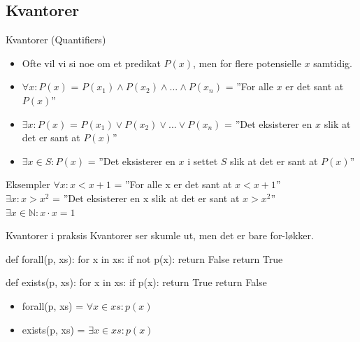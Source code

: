 \subsection{Kvantorer}
\begin{frame}{Kvantorer (Quantifiers)}
    \begin{itemize}
        \item Ofte vil vi si noe om et predikat $P(x)$, men for flere potensielle $x$ samtidig.
        \pause
        \item $\forall x : P(x)$ = $P(x_1) \land P(x_2) \land ... \land P(x_n)$ = ''For alle $x$ er det sant at $P(x)$''
        \pause
        \item $\exists x : P(x)$ = $P(x_1) \lor P(x_2) \lor ... \lor P(x_n)$ = ''Det eksisterer en $x$ slik at det er sant at $P(x)$''
        \pause
        \item $\exists x \in S : P(x)$ = ''Det eksisterer en $x$ i settet $S$ slik at  det er sant at $P(x)$''
    \end{itemize}
    
    \pause
    \begin{block}{Eksempler}
        $\forall x : x < x + 1$ = ''For alle x er det sant at $x < x +1$''\\
        $\exists x : x > x^2$ = ''Det eksisterer en x slik at det er sant at $x > x^2$''\\
        $\exists x \in \mathbb{N} : x \cdot x = 1$\\
    \end{block}
\end{frame}

\begin{frame}[fragile]{Kvantorer i praksis}
    Kvantorer ser skumle ut, men det er bare for-løkker.
    \begin{python}
def forall(p, xs):
    for x in xs:
        if not p(x):
            return False
    return True
    
def exists(p, xs):
    for x in xs:
        if p(x):
            return True
    return False
    \end{python}
    
    \pause
    \begin{itemize}
        \item forall(p, xs) = $\forall x \in xs : p(x)$        
        \item exists(p, xs) = $\exists x \in xs : p(x)$
    \end{itemize}
\end{frame}

